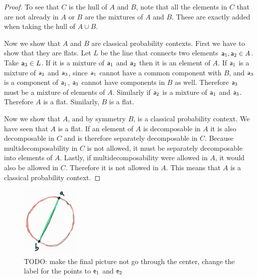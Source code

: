 \begin{mathSection}
\begin{proof}
		To see that $C$ is the hull of $A$ and $B$, note that all the elements in $C$ that are not already in $A$ or $B$ are the mixtures of $A$ and $B$. These are exactly added when taking the hull of $A \cup B$.
		
		Now we show that $A$ and $B$ are classical probability contexts. First we have to show that they are flats. Let $L$ be the line that connects two elements $\ens[a]_1, \ens[a]_2 \in A$. Take $\ens[a]_3 \in L$. If it is a mixture of $\ens[a]_1$ and $\ens[a]_2$ then it is an element of $A$. If $\ens[a]_1$ is a mixture of $\ens[a]_2$ and $\ens[a]_3$, since $\ens[a]_1$ cannot have a common component with $B$, and $\ens[a]_3$ is a component of $\ens[a]_1$, $\ens[a]_3$ cannot have components in $B$ as well. Therefore $\ens[a]_3$ must be a mixture of elements of $A$. Similarly if $\ens[a]_2$ is a mixture of $\ens[a]_1$ and $\ens[a]_3$. Therefore $A$ is a flat. Similarly, $B$ is a flat.
		
		Now we show that $A$, and by symmetry $B$, is a classical probability context. We have seen that $A$ is a flat. If an element of $A$ is decomposable in $A$ it is also decomposable in $C$ and is therefore separately decomposable in $C$. Because multidecomposability in $C$ is not allowed, it must be separately decomposable into elements of $A$. Lastly, if multidecomposability were allowed in $A$, it would also be allowed in $C$. Therefore it is not allowed in $A$. This means that $A$ is a classical probability context.
	\end{proof}
	
	\begin{figure}[H]
		\centering
		\includegraphics[width=0.25\textwidth]{tempimages/CounterexampleProbabilityContexts.jpg}
		\caption{TODO: make the final picture not go through the center, change the label for the points to $\ens_1$ and $\ens_2$}
	\end{figure}
	

\end{mathSection}
